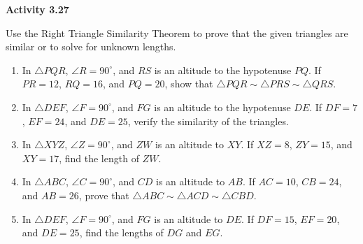 \vspace{0.3ex}
\noindent\textbf{Activity 3.27}

\vspace{0.2ex}

Use the Right Triangle Similarity Theorem to prove that the given triangles are similar or to solve for unknown lengths.

\begin{enumerate}[label=\color{blue}\arabic*.]
    \item In \(\triangle PQR\), \(\angle R = 90^\circ\), and \(RS\) is an altitude to the hypotenuse \(PQ\). If \(PR = 12\), \(RQ = 16\), and \(PQ = 20\), show that \(\triangle PQR \sim \triangle PRS \sim \triangle QRS\).
    \item In \(\triangle DEF\), \(\angle F = 90^\circ\), and \(FG\) is an altitude to the hypotenuse \(DE\). If \(DF = 7\), \(EF = 24\), and \(DE = 25\), verify the similarity of the triangles.
    \item In \(\triangle XYZ\), \(\angle Z = 90^\circ\), and \(ZW\) is an altitude to \(XY\). If \(XZ = 8\), \(ZY = 15\), and \(XY = 17\), find the length of \(ZW\).
    \item In \(\triangle ABC\), \(\angle C = 90^\circ\), and \(CD\) is an altitude to \(AB\). If \(AC = 10\), \(CB = 24\), and \(AB = 26\), prove that \(\triangle ABC \sim \triangle ACD \sim \triangle CBD\).
    \item In \(\triangle DEF\), \(\angle F = 90^\circ\), and \(FG\) is an altitude to \(DE\). If \(DF = 15\), \(EF = 20\), and \(DE = 25\), find the lengths of \(DG\) and \(EG\).
\end{enumerate}
